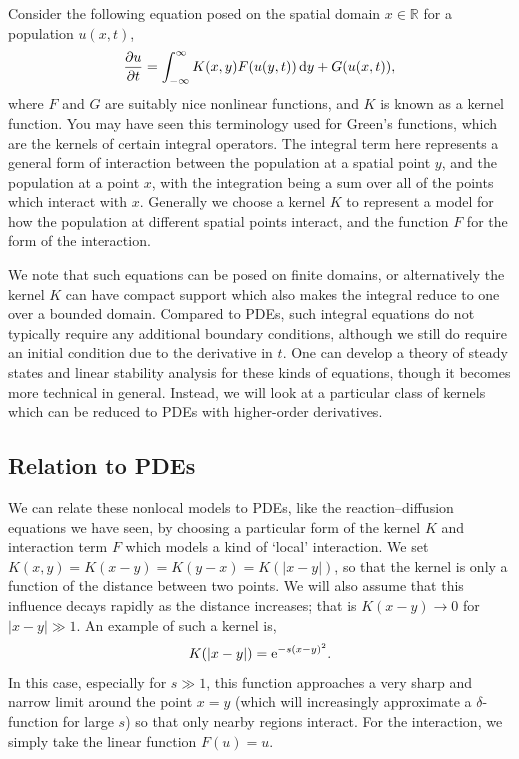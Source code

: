 \documentclass[main.tex]{subfiles}
\begin{document}
Consider the following equation posed on the spatial domain $x \in \mathbb{R}$ for a population $u(x,t)$,
\begin{equation}\label{nonlocal_PDE}
    \pd{u}{t} = \int_{-\infty}^{\infty} K(x,y) F(u(y,t)) \, \d y + G(u(x,t)),
\end{equation}
where $F$ and $G$ are suitably nice nonlinear functions, and $K$ is known as a kernel function. You may have seen this terminology used for Green's functions, which are the kernels of certain integral operators. The integral term here represents a general form of interaction between the population at a spatial point $y$, and the population at a point $x$, with the integration being a sum over all of the points which interact with $x$. Generally we choose a kernel $K$ to represent a model for how the population at different spatial points interact, and the function $F$ for the form of the interaction.

We note that such equations can be posed on finite domains, or alternatively the kernel $K$ can have compact support which also makes the integral reduce to one over a bounded domain. Compared to PDEs, such integral equations do not typically require any additional boundary conditions, although we still do require an initial condition due to the derivative in $t$. One can develop a theory of steady states and linear stability analysis for these kinds of equations, though it becomes more technical in general. Instead, we will look at a particular class of kernels which can be reduced to PDEs with higher-order derivatives.

\subsection{Relation to PDEs}

We can relate these nonlocal models to PDEs, like the reaction--diffusion equations we have seen, by choosing a particular form of the kernel $K$ and interaction term $F$ which models a kind of `local' interaction. We set $K(x,y) = K(x-y)=K(y-x)=K(|x-y|)$, so that the kernel is only a function of the distance between two points. We will also assume that this influence decays rapidly as the distance increases; that is $K(x-y) \to 0$ for $|x-y| \gg 1$. An example of such a kernel is,
\begin{equation}\label{example_kernel}
    K(|x-y|) = \mathrm{e}^{-s(x-y)^2}.
\end{equation}
In this case, especially for $s \gg 1$, this function approaches a very sharp and narrow limit around the point $x=y$ (which will increasingly approximate a $\delta$-function for large $s$) so that only nearby regions interact. For the interaction, we simply take the linear function $F(u) = u$.
\end{document}
